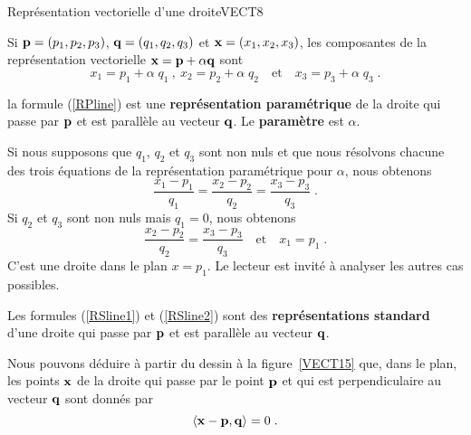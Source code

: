 {
{Représentation vectorielle d'une droite}{VECT8}

Si $\mathbf{p}=(p_1,p_2,p_3)$, $\mathbf{q} = (q_1, q_2, q_3)$ et
$\mathbf{x}=(x_1,x_2,x_3)$,  les composantes de la représentation vectorielle
$\mathbf{x} = \mathbf{p} + \alpha \mathbf{q}$ sont
\begin{equation}\label{RPline}
x_1 = p_1 + \alpha\; q_1 \ , \ x_2 = p_2 + \alpha\; q_2 \quad \text{et}
\quad x_3 = p_3 + \alpha\; q_3 \; .
\end{equation}

\begin{focus}{\dfn} 
la formule (\ref{RPline}) est une {\bfseries représentation
paramétrique} de la droite qui passe par $\mathbf{p}$ et est parallèle au
vecteur $\mathbf{q}$.  Le {\bfseries paramètre} est $\alpha$.
\end{focus}

Si nous supposons que $q_1$, $q_2$ et $q_3$ sont non nuls et que nous
résolvons chacune des trois équations de la représentation paramétrique
pour $\alpha$, nous obtenons 
\begin{equation}\label{RSline1}
\frac{x_1-p_1}{q_1} = \frac{x_2-p_2}{q_2} = \frac{x_3-p_3}{q_3} \; .
\end{equation}
Si $q_2$ et $q_3$ sont non nuls mais $q_1 = 0$, nous obtenons
\begin{equation}\label{RSline2}
\frac{x_2-p_2}{q_2} = \frac{x_3-p_3}{q_3} \quad \text{et} \quad x_1 = p_1 \; .
\end{equation}
C'est une droite dans le plan $x=p_1$.  Le lecteur est invité à
analyser les autres cas possibles.

\begin{focus}{\dfn} 
Les formules (\ref{RSline1}) et (\ref{RSline2}) sont des
{\bfseries représentations standard}
d'une droite qui passe par $\mathbf{p}$ et est parallèle au vecteur
$\mathbf{q}$.
\end{focus}

\begin{rmk}
Nous pouvons déduire à partir du dessin à la figure~\ref{VECT15} que,
dans le plan, les points $\mathbf{x}$ de la droite qui passe par le point
$\mathbf{p}$ et qui est perpendiculaire au vecteur $\mathbf{q}$ sont donnés par
\[
\left\langle{\mathbf{x} - \mathbf{p}} , {\mathbf{q}}\right\rangle = 0 \; .
\]
\end{rmk}


}
